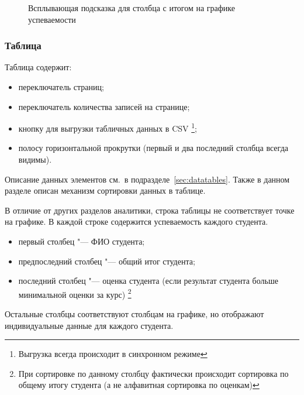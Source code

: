 \begin{figure}[H]
	\caption{Всплывающая подсказка для столбца с итогом на графике успеваемости}
	\label{analytics:progress:chart:tooltip:avg}
\end{figure}

\subsubsection{Таблица}

Таблица содержит:
\begin{itemize}
	\item переключатель страниц;
 	\item переключатель количества записей на странице;
 	\item кнопку  для выгрузки табличных данных в 
 	CSV \footnote{Выгрузка всегда происходит в синхронном режиме};
 	\item полосу горизонтальной прокрутки (первый и два последний столбца всегда видимы).
\end{itemize} 
Описание данных элементов см.\ в подразделе~\ref{sec:datatables}. Также в данном разделе описан механизм
сортировки данных в таблице. 


В отличие от других разделов аналитики, строка таблицы не соответствует точке на графике. 
В каждой строке содержится успеваемость каждого студента.
\begin{itemize}
	\item первый столбец "--- ФИО студента;
	\item предпоследний столбец "--- общий итог студента;
	\item последний столбец "--- оценка студента (если результат студента больше минимальной оценки за курс)
	\footnote{При сортировке по данному столбцу фактически происходит сортировка по общему итогу 
	студента (а не алфавитная сортировка по оценкам)}
\end{itemize}
Остальные столбцы соответствуют столбцам на графике, но отображают индивидуальные данные для 
каждого студента.

